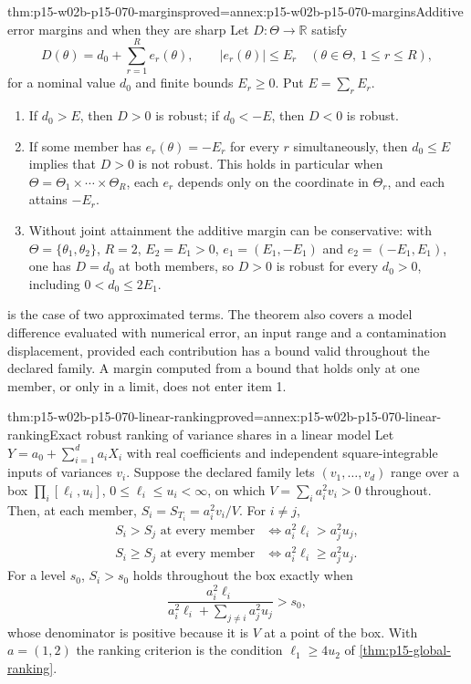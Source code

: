\begin{hbtheorem}{thm:p15-w02b-p15-070-margins}{proved=annex:p15-w02b-p15-070-margins}{Additive error margins and when they are sharp}
Let \(D:\Theta\to\mathbb R\) satisfy
\[
 D(\theta)=d_0+\sum_{r=1}^R e_r(\theta),\qquad
 |e_r(\theta)|\leq E_r\quad(\theta\in\Theta,\ 1\leq r\leq R),
\]
for a nominal value \(d_0\) and finite bounds \(E_r\geq0\).
Put \(E=\sum_rE_r\).
\begin{enumerate}
\item If \(d_0>E\), then \(D>0\) is robust; if \(d_0<-E\), then
      \(D<0\) is robust.
\item If some member has \(e_r(\theta)=-E_r\) for every \(r\)
      simultaneously, then \(d_0\leq E\) implies that \(D>0\) is not
      robust. This holds in particular when
      \(\Theta=\Theta_1\times\cdots\times\Theta_R\), each \(e_r\)
      depends only on the coordinate in \(\Theta_r\), and each attains
      \(-E_r\).
\item Without joint attainment the additive margin can be conservative:
      with \(\Theta=\{\theta_1,\theta_2\}\), \(R=2\),
      \(E_2=E_1>0\), \(e_1=(E_1,-E_1)\) and \(e_2=(-E_1,E_1)\), one has
      \(D=d_0\) at both members, so \(D>0\) is robust for every
      \(d_0>0\), including \(0<d_0\leq2E_1\).
\end{enumerate}
\end{hbtheorem}

 is the case of two approximated
terms. The theorem also covers a model difference evaluated with numerical
error, an input range and a contamination displacement, provided each
contribution has a bound valid throughout the declared family.
A margin computed from a bound that holds only at one member, or only in
a limit, does not enter item 1.

\begin{hbtheorem}{thm:p15-w02b-p15-070-linear-ranking}{proved=annex:p15-w02b-p15-070-linear-ranking}{Exact robust ranking of variance shares in a linear model}
Let \(Y=a_0+\sum_{i=1}^d a_iX_i\) with real coefficients and independent
square-integrable inputs of variances \(v_i\). Suppose the declared family
lets \((v_1,\ldots,v_d)\) range over a box
\(\prod_i[\ell_i,u_i]\), \(0\leq\ell_i\leq u_i<\infty\), on which
\(V=\sum_ia_i^2v_i>0\) throughout. Then, at each member,
\(S_i=S_{T_i}=a_i^2v_i/V\). For \(i\ne j\),
\[
\begin{aligned}
 S_i>S_j\text{ at every member}&\iff a_i^2\ell_i>a_j^2u_j,\\
 S_i\geq S_j\text{ at every member}&\iff a_i^2\ell_i\geq a_j^2u_j.
\end{aligned}
\]
For a level \(s_0\), \(S_i>s_0\) holds throughout the box exactly when
\[
 \frac{a_i^2\ell_i}{a_i^2\ell_i+\sum_{j\ne i}a_j^2u_j}>s_0,
\]
whose denominator is positive because it is \(V\) at a point of the box.
With \(a=(1,2)\) the ranking criterion is the condition
\(\ell_1\geq4u_2\) of \cref{thm:p15-global-ranking}.
\end{hbtheorem}

